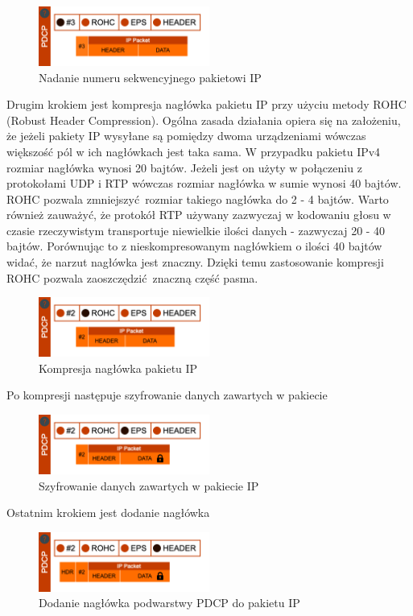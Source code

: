 \begin{figure}
	\centering
		\includegraphics[width=0.5\textwidth]{images/pdcp_1.png}
	\caption{Nadanie numeru sekwencyjnego pakietowi IP}
\end{figure}

Drugim krokiem jest kompresja nagłówka pakietu IP przy użyciu metody ROHC (Robust Header Compression). Ogólna zasada działania opiera się na założeniu, że jeżeli pakiety IP wysyłane są pomiędzy dwoma urządzeniami wówczas większość pól w ich nagłówkach jest taka sama. W przypadku pakietu IPv4 rozmiar nagłówka wynosi 20 bajtów. Jeżeli jest on użyty w połączeniu z protokołami UDP i RTP wówczas rozmiar nagłówka w sumie wynosi 40 bajtów. ROHC pozwala zmniejszyć rozmiar takiego nagłówka do 2 - 4 bajtów. Warto również zauważyć, że protokół RTP używany zazwyczaj w kodowaniu głosu w czasie rzeczywistym transportuje niewielkie ilości danych - zazwyczaj 20 - 40 bajtów. Porównując to z nieskompresowanym nagłówkiem o ilości 40 bajtów widać, że narzut nagłówka jest znaczny. Dzięki temu zastosowanie kompresji ROHC pozwala zaoszczędzić znaczną część pasma.

\begin{figure}
	\centering
		\includegraphics[width=0.5\textwidth]{images/pdcp_2.png}
	\caption{Kompresja nagłówka pakietu IP}
\end{figure}

Po kompresji następuje szyfrowanie danych zawartych w pakiecie

\begin{figure}
	\centering
		\includegraphics[width=0.5\textwidth]{images/pdcp_3.png}
	\caption{Szyfrowanie danych zawartych w pakiecie IP}
\end{figure}

Ostatnim krokiem jest dodanie nagłówka 

\begin{figure}
	\centering
		\includegraphics[width=0.5\textwidth]{images/pdcp_4.png}
	\caption{Dodanie nagłówka podwarstwy PDCP do pakietu IP}
\end{figure}